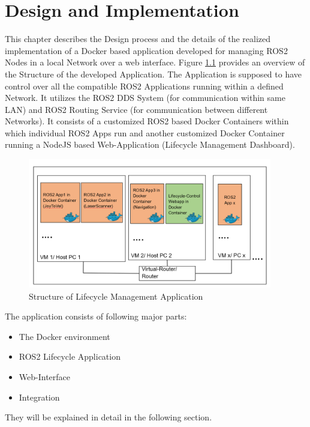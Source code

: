 \chapter{Design and Implementation}
\label{Implementation}

This chapter describes the Design process and the details of the realized implementation of a Docker based application developed for managing ROS2 Nodes in a local Network over a web interface. Figure \ref*{fig:Background:LifecycleManagement} provides an overview of the Structure of the developed Application. The Application is supposed to have control over all the compatible ROS2 Applications running within a defined Network. It utilizes the ROS2 DDS System (for communication within same LAN) and ROS2 Routing Service (for communication between different Networks). It consists of a customized ROS2 based Docker Containers within which individual ROS2 Apps run and another customized Docker Container running a NodeJS based Web-Application (Lifecycle Management Dashboard).   

\begin{figure}[H]
	\centering
	\includegraphics[width=0.95\textwidth]{"Bilder/Application-Structure.png"}
	\caption{Structure of Lifecycle Management Application}
	\label{fig:Background:LifecycleManagement}					
\end{figure}
The application consists of following major parts:

\begin{itemize}
	\item The Docker environment
	\item ROS2 Lifecycle Application
	\item Web-Interface
	\item Integration
\end{itemize}

They will be explained in detail in the following section.

